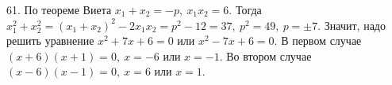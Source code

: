 61. По теореме Виета $x_1+x_2=-p,\ x_1x_2=6.$ Тогда $x_1^2+x_2^2=(x_1+x_2)^2-2x_1x_2=p^2-12=37,\ p^2=49,\ p=\pm7.$ Значит, надо решить уравнение $x^2+7x+6=0$ или  $x^2-7x+6=0.$ В первом случае $(x+6)(x+1)=0,\ x=-6$ или $x=-1.$ Во втором случае $(x-6)(x-1)=0,\ x=6$ или $x=1.$\\
